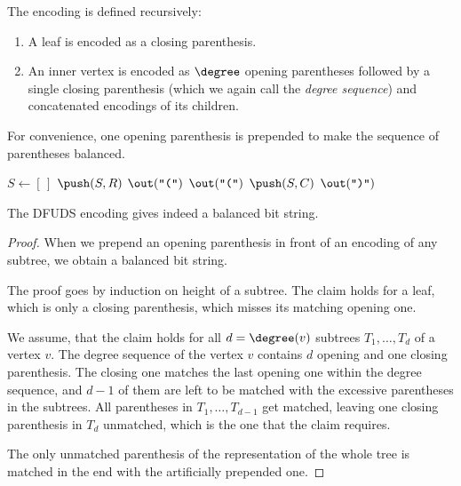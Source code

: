 The encoding is defined recursively:
\begin{enumerate}
	\item A leaf is encoded as a closing parenthesis.
	\item An inner vertex is encoded as $\degree$ opening parentheses followed by a single closing parenthesis (which we again call the \emph{degree sequence}) and concatenated encodings of its children.
\end{enumerate}
For convenience, one opening parenthesis is prepended to make the sequence of parentheses balanced.

\begin{algorithm}
\begin{algorithmic}
	\State $S \gets [\,]$%
	\Instr $\push(S, R)$ 
	\State $\out(\openingParen)$
			\State $\out(\openingParen)$
			\State $\push(S, C)$
		\EndFor
		\State $\out(\closingParen)$
	\EndWhile
\EndFunction
\end{algorithmic}
\end{algorithm}

\begin{lemma}\label{l:dfuds}
	The DFUDS encoding gives indeed a balanced bit string.
\end{lemma}
\begin{proof}
	When we prepend an opening parenthesis in front of an encoding of any subtree, we obtain a balanced bit string.
	
	The proof goes by induction on height of a subtree.
	The claim holds for a leaf, which is only a closing parenthesis, which misses its matching opening one.
	
	We assume, that the claim holds for all $d = \degree(v)$ subtrees $T_1, \ldots, T_d$ of a vertex $v$.
	The degree sequence of the vertex $v$ contains $d$ opening and one closing parenthesis.
	The closing one matches the last opening one within the degree sequence, and $d - 1$ of them are left to be matched with the excessive parentheses in the subtrees.
	All parentheses in $T_1, \ldots, T_{d-1}$ get matched, leaving one closing parenthesis in $T_d$ unmatched, which is the one that the claim requires.
	
	The only unmatched parenthesis of the representation of the whole tree is matched in the end with the artificially prepended one.
\end{proof}

